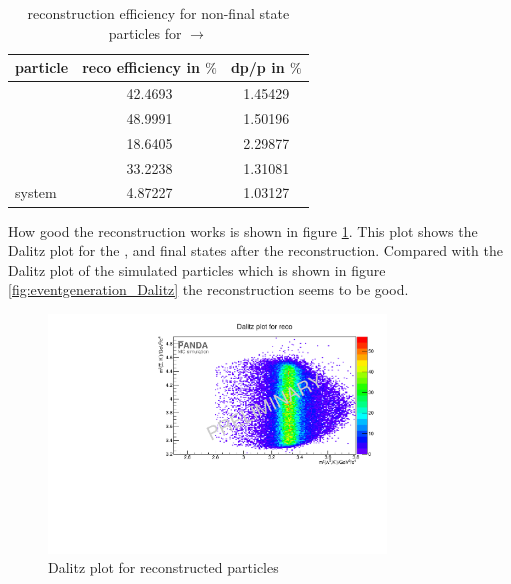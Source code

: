 		\begin{table}
		\centering
		\caption{reconstruction efficiency for non-final state particles for \pbarpSystem $\rightarrow$ \excitedanticascade \cascade}
		\label{tab:non-finalstate_efficiency_cc}
		
		\begin{tabular}{lcc}
		
			\hline
			particle & reco efficiency in $\%$ & dp/p in $\%$ \\\hline
			\hline
			\lam & 42.4693&   1.45429 \\
			\alam & 48.9991&   1.50196\\
			\cascade & 18.6405&   2.29877\\
			\excitedanticascade & 33.2238&   1.31081\\
			\excitedanticascade \cascade system & 4.87227&   1.03127\\\hline
			 	
		\end{tabular}
	\end{table}
	
	How good the reconstruction works is shown in figure \ref{fig:reco_Dalitzplot}.
	This plot shows the Dalitz plot for the \anticascade, \lam and \kminus final states after the reconstruction. 
	Compared with the Dalitz plot of the simulated particles which is shown in figure \ref{fig:eventgeneration_Dalitz} the reconstruction seems to be good.
	
	\begin{figure}
		\centering
		\includegraphics[width=0.8\textwidth]{./plots/pbarp/Dalitzplot_reco.pdf}
		\caption{Dalitz plot for reconstructed particles}
		\label{fig:reco_Dalitzplot}
	
	\end{figure}
	
	